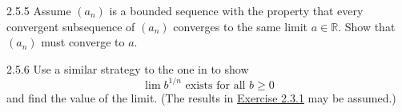 \begin{exercise}
    {2.5.5} Assume $(a_n)$ is a bounded sequence with the property that every convergent subsequence of $(a_n)$ converges to the same limit $a \in \mathbb{R}$. Show that $(a_n)$ must converge to $a$.
\end{exercise}

\expf{

}

\begin{exercise}
    {2.5.6} Use a similar strategy to the one in  to show
    \[\lim b^{1/n} \text{ exists for all } b \geq 0\] and find the value of the limit. (The results in \hyperref[ex:2.3.1]{Exercise 2.3.1} may be assumed.)
\end{exercise}

\expf{

}
